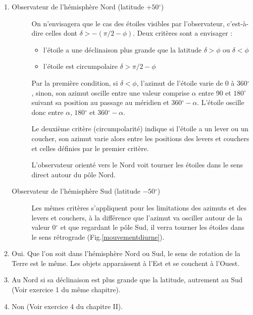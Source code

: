 \documentclass[a4paper,10pt]{report}
\renewcommand{\deg}{\ensuremath{^{\circ}}}
\begin{document}
\begin{Answer}
  \begin{enumerate}
  \item
    \begin{description}
    \item[Observateur de l'hémisphère Nord (latitude $+50\deg$)] On
      n'envisagera que le cas des étoiles visibles par l'observateur,
      c'est-à-dire celles dont $\delta > -(\pi/2 - \phi)$. Deux
      critères sont a envisager :
      \begin{itemize}
      \item l'étoile a une déclinaison plus grande que la latitude
        $\delta>\phi$ ou $\delta<\phi$
      \item l'étoile est circumpolaire $\delta > \pi/2 - \phi$
      \end{itemize}
      Par la première condition, si $\delta<\phi$, l'azimut de
      l'étoile varie de 0 à $360\deg$, sinon, son azimut oscille
      entre une valeur comprise $\alpha$ entre 90 et $180\deg$
      suivant sa position au passage au méridien et
      $360\deg-\alpha$. L'étoile oscille donc entre $\alpha$,
      $180\deg$ et $360\deg-\alpha$.

      Le deuxième critère (circumpolarité) indique si l'étoile a un
      lever ou un coucher, son azimut varie alors entre les positions
      des levers et couchers et celles définies par le premier
      critère.

      L'observateur orienté vers le Nord voit tourner les étoiles dans
      le sens direct autour du pôle Nord.

    \item[Observateur de l'hémisphère Sud (latitude $-50\deg$)] Les
      mêmes critères s'appliquent pour les limitations des azimuts et
      des levers et couchers, à la différence que l'azimut va osciller
      autour de la valeur $0\deg$ et que regardant le pôle Sud, il
      verra tourner les étoiles dans le sens rétrograde
      (Fig.\ref{mouvementdiurne}).
    \end{description}
  \item Oui. Que l'on soit dans l'hémisphère Nord ou Sud, le sens de
    rotation de la Terre est le même. Les objets apparaissent à l'Est
    et se couchent à l'Ouest.

  \item Au Nord si sa déclinaison est plus grande que la latitude,
    autrement au Sud (Voir exercice 1 du même chapitre).

  \item Non (Voir exercice 4 du chapitre II).
  \end{enumerate}
\end{Answer}
\end{document}
